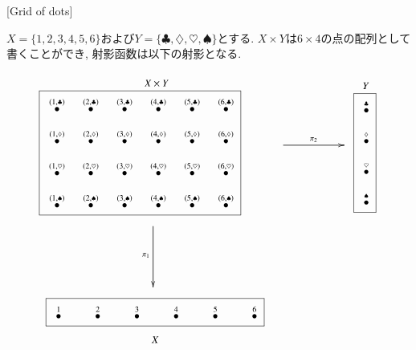 \begin{example}\label{ex:grid1}[Grid of dots]

$X=\{1,2,3,4,5,6\}$および$Y=\{\clubsuit,\diamondsuit,\heartsuit,\spadesuit\}$とする. $X\times Y$は$6\times4$の点の配列として書くことができ, 射影函数は以下の射影となる.
\begin{align}
\parbox{2.9in}{\begin{center}\small $X\times Y$\vspace{-.1in}\end{center}\fbox{
\xymatrix@=10pt{
\LMO{(1,\clubsuit)}&\LMO{(2,\clubsuit)}&\LMO{(3,\clubsuit)}&\LMO{(4,\clubsuit)}&\LMO{(5,\clubsuit)}&\LMO{(6,\clubsuit)}\\
\LMO{(1,\diamondsuit)}&\LMO{(2,\diamondsuit)}&\LMO{(3,\diamondsuit)}&\LMO{(4,\diamondsuit)}&\LMO{(5,\diamondsuit)}&\LMO{(6,\diamondsuit)}\\
\LMO{(1,\heartsuit)}&\LMO{(2,\heartsuit)}&\LMO{(3,\heartsuit)}&\LMO{(4,\heartsuit)}&\LMO{(5,\heartsuit)}&\LMO{(6,\heartsuit)}\\
\LMO{(1,\spadesuit)}&\LMO{(2,\spadesuit)}&\LMO{(3,\spadesuit)}&\LMO{(4,\spadesuit)}&\LMO{(5,\spadesuit)}&\LMO{(6,\spadesuit)}\\
}}}
\parbox{.9in}{
\xymatrix{~\ar[rr]^{\pi_2}&&~}
}
\parbox{.3in}{\begin{center}\small $Y$\vspace{-.1in}\end{center}\fbox{
\xymatrix@=10pt{
\LMO{\clubsuit}\\\LMO{\diamondsuit}\\\LMO{\heartsuit}\\\LMO{\spadesuit}
}}}
\\\nonumber
\parbox{1in}{\hspace{-1.95in}\xymatrix{~\ar[dd]_{\pi_1}\\\\~}}
\\\nonumber
\parbox{2.9in}{\hspace{-1.2in}\fbox{
\xymatrix@=24pt{
\LMO{1}&\LMO{2}&\LMO{3}&\LMO{4}&\LMO{5}&\LMO{6}
}}\begin{center}\hspace{-2.6in}\small$X$\end{center}}
\end{align}

\end{example}


